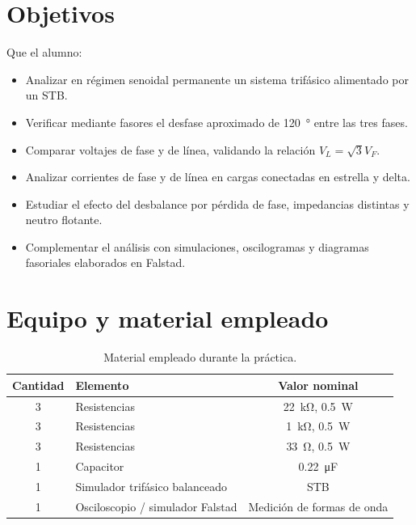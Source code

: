 \section{Objetivos}

Que el alumno:
\begin{itemize}
	\item Analizar en régimen senoidal permanente un sistema trifásico alimentado por un STB.
	\item Verificar mediante fasores el desfase aproximado de \SI{120}{\degree} entre las tres fases.
	\item Comparar voltajes de fase y de línea, validando la relación $V_L=\sqrt{3}V_F$.
	\item Analizar corrientes de fase y de línea en cargas conectadas en estrella y delta.
	\item Estudiar el efecto del desbalance por pérdida de fase, impedancias distintas y neutro flotante.
	\item Complementar el análisis con simulaciones, oscilogramas y diagramas fasoriales elaborados en Falstad.
\end{itemize}

\section{Equipo y material empleado}
\begin{table}[H]
	\centering
	\caption{Material empleado durante la práctica.}
	\begin{tabular}{clc}
		\toprule
		Cantidad & Elemento & Valor nominal \\
		\midrule
		3 & Resistencias & \SI{22}{\kilo\ohm}, \SI{0.5}{W} \\
		3 & Resistencias & \SI{1}{\kilo\ohm}, \SI{0.5}{W} \\
		3 & Resistencias & \SI{33}{\ohm}, \SI{0.5}{W} \\
		1 & Capacitor & \SI{0.22}{\micro F} \\
		1 & Simulador trifásico balanceado & STB \\
		1 & Osciloscopio / simulador Falstad & Medición de formas de onda \\
		\bottomrule
	\end{tabular}
\end{table}